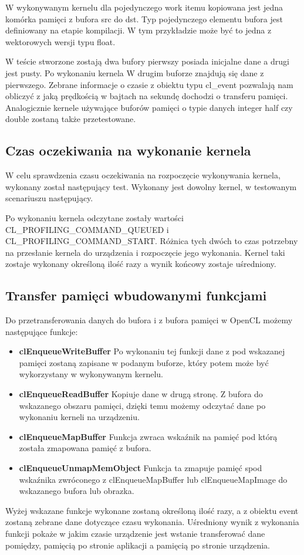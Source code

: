 
 
W wykonywanym kernelu dla pojedynczego work itemu kopiowana jest jedna komórka pamięci z bufora src do dst. Typ pojedynczego elementu bufora jest definiowany na etapie kompilacji. W tym przykładzie może być to jedna z wektorowych wersji typu float.

W teście stworzone zostają dwa bufory pierwszy posiada inicjalne dane a drugi jest pusty. Po wykonaniu kernela W drugim buforze znajdują się dane z pierwszego. Zebrane informacje o czasie z obiektu typu cl\_event pozwalają nam obliczyć z jaką prędkością w bajtach na sekundę dochodzi o transferu pamięci.
Analogicznie kernele używające buforów pamięci o typie danych integer half czy double zostaną także przetestowane.

\subsection[Czas oczekiwania na wykonanie kernela]{Czas oczekiwania na wykonanie kernela}
W celu sprawdzenia czasu oczekiwania na rozpoczęcie wykonywania kernela, wykonany został następujący test. Wykonany jest dowolny kernel, w testowanym scenariuszu następujący.



Po wykonaniu kernela odczytane zostały wartości CL\_PROFILING\_COMMAND\_QUEUED i CL\_PROFILING\_COMMAND\_START. Różnica tych dwóch to czas potrzebny na przesłanie kernela do urządzenia i rozpoczęcie jego wykonania. Kernel taki zostaje wykonany określoną ilość razy a wynik końcowy zostaje uśredniony.
\subsection[Transfer pamięci wbudowanymi funkcjami]{Transfer pamięci wbudowanymi funkcjami}
Do przetransferowania danych do bufora i z bufora pamięci w OpenCL możemy następujące funkcje:
 \begin{itemize}
	\item \textbf{clEnqueueWriteBuffer} Po wykonaniu tej funkcji dane z pod wskazanej pamięci zostaną zapisane w podanym buforze, który potem może być wykorzystany w wykonywanym kernelu.
	\item \textbf{clEnqueueReadBuffer} Kopiuje dane w drugą stronę. Z bufora do wskazanego obszaru pamięci, dzięki temu możemy odczytać dane po wykonaniu kerneli na urządzeniu.
	\item \textbf{clEnqueueMapBuffer} Funkcja zwraca wskaźnik na pamięć pod którą została zmapowana pamięć z bufora.
	\item \textbf{clEnqueueUnmapMemObject} Funkcja ta zmapuje pamięć spod wskaźnika zwróconego z clEnqueueMapBuffer lub clEnqueueMapImage do wskazanego bufora lub obrazka.
\end{itemize}
Wyżej wskazane funkcje wykonane zostaną określoną ilość razy, a z obiektu event zostaną zebrane dane dotyczące czasu wykonania. Uśredniony wynik z wykonania funkcji pokaże w jakim czasie urządzenie jest wstanie transferować dane pomiędzy, pamięcią po stronie aplikacji a pamięcią po stronie urządzenia.
